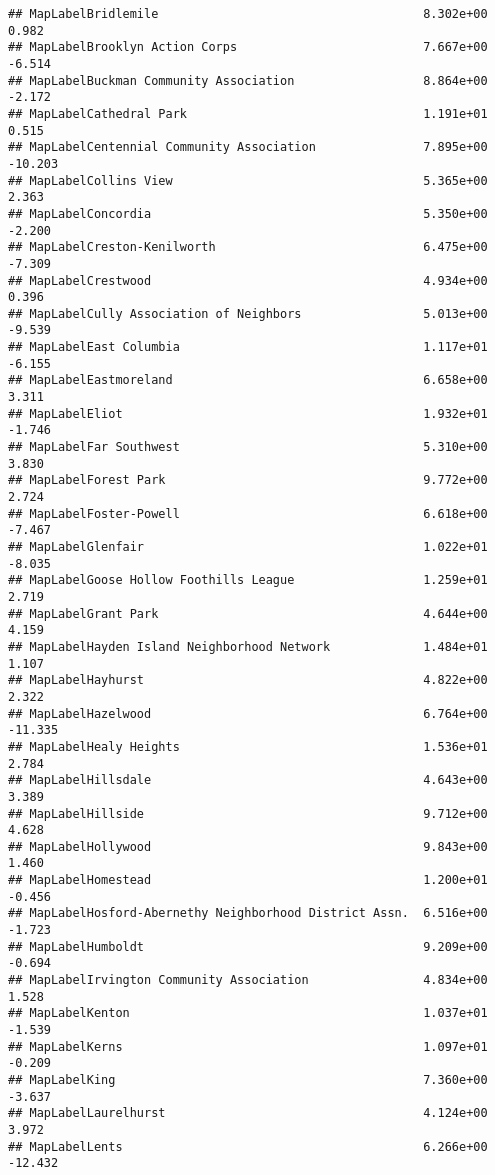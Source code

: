 \documentclass[]{article}
\begin{document}
\begin{verbatim}
## MapLabelBridlemile                                     8.302e+00   0.982
## MapLabelBrooklyn Action Corps                          7.667e+00  -6.514
## MapLabelBuckman Community Association                  8.864e+00  -2.172
## MapLabelCathedral Park                                 1.191e+01   0.515
## MapLabelCentennial Community Association               7.895e+00 -10.203
## MapLabelCollins View                                   5.365e+00   2.363
## MapLabelConcordia                                      5.350e+00  -2.200
## MapLabelCreston-Kenilworth                             6.475e+00  -7.309
## MapLabelCrestwood                                      4.934e+00   0.396
## MapLabelCully Association of Neighbors                 5.013e+00  -9.539
## MapLabelEast Columbia                                  1.117e+01  -6.155
## MapLabelEastmoreland                                   6.658e+00   3.311
## MapLabelEliot                                          1.932e+01  -1.746
## MapLabelFar Southwest                                  5.310e+00   3.830
## MapLabelForest Park                                    9.772e+00   2.724
## MapLabelFoster-Powell                                  6.618e+00  -7.467
## MapLabelGlenfair                                       1.022e+01  -8.035
## MapLabelGoose Hollow Foothills League                  1.259e+01   2.719
## MapLabelGrant Park                                     4.644e+00   4.159
## MapLabelHayden Island Neighborhood Network             1.484e+01   1.107
## MapLabelHayhurst                                       4.822e+00   2.322
## MapLabelHazelwood                                      6.764e+00 -11.335
## MapLabelHealy Heights                                  1.536e+01   2.784
## MapLabelHillsdale                                      4.643e+00   3.389
## MapLabelHillside                                       9.712e+00   4.628
## MapLabelHollywood                                      9.843e+00   1.460
## MapLabelHomestead                                      1.200e+01  -0.456
## MapLabelHosford-Abernethy Neighborhood District Assn.  6.516e+00  -1.723
## MapLabelHumboldt                                       9.209e+00  -0.694
## MapLabelIrvington Community Association                4.834e+00   1.528
## MapLabelKenton                                         1.037e+01  -1.539
## MapLabelKerns                                          1.097e+01  -0.209
## MapLabelKing                                           7.360e+00  -3.637
## MapLabelLaurelhurst                                    4.124e+00   3.972
## MapLabelLents                                          6.266e+00 -12.432

\end{verbatim}
\end{document}
